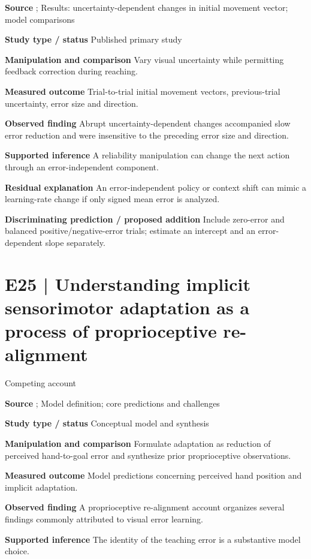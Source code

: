 \documentclass[11pt,a4paper]{article}
\begin{document}
\textbf{Source} \cite{uncertain2023}; Results: uncertainty-dependent changes in initial movement vector; model comparisons\par
\textbf{Study type / status} Published primary study\par
\textbf{Manipulation and comparison} Vary visual uncertainty while permitting feedback correction during reaching.\par
\textbf{Measured outcome} Trial-to-trial initial movement vectors, previous-trial uncertainty, error size and direction.\par
\textbf{Observed finding} Abrupt uncertainty-dependent changes accompanied slow error reduction and were insensitive to the preceding error size and direction.\par
\textbf{Supported inference} A reliability manipulation can change the next action through an error-independent component.\par
\textbf{Residual explanation} An error-independent policy or context shift can mimic a learning-rate change if only signed mean error is analyzed.\par
\textbf{Discriminating prediction / proposed addition} Include zero-error and balanced positive/negative-error trials; estimate an intercept and an error-dependent slope separately.\par
\clearpage\section{E25 | Understanding implicit sensorimotor adaptation as a process of proprioceptive re-alignment}
{\small\sffamily\color{navy} Competing account}\par
\textbf{Source} \cite{premo2022}; Model definition; core predictions and challenges\par
\textbf{Study type / status} Conceptual model and synthesis\par
\textbf{Manipulation and comparison} Formulate adaptation as reduction of perceived hand-to-goal error and synthesize prior proprioceptive observations.\par
\textbf{Measured outcome} Model predictions concerning perceived hand position and implicit adaptation.\par
\textbf{Observed finding} A proprioceptive re-alignment account organizes several findings commonly attributed to visual error learning.\par
\textbf{Supported inference} The identity of the teaching error is a substantive model choice.\par
\end{document}
